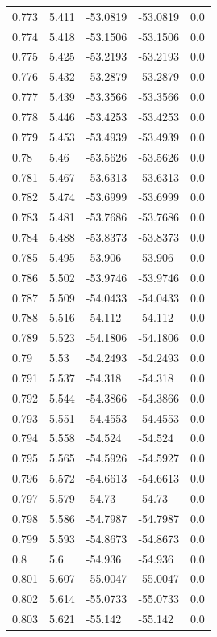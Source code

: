 \begin{table}[H]
\begin{tabular}{lllll}
0.773 & 5.411 & -53.0819 & -53.0819 & 0.0 \\
0.774 & 5.418 & -53.1506 & -53.1506 & 0.0 \\
0.775 & 5.425 & -53.2193 & -53.2193 & 0.0 \\
0.776 & 5.432 & -53.2879 & -53.2879 & 0.0 \\
0.777 & 5.439 & -53.3566 & -53.3566 & 0.0 \\
0.778 & 5.446 & -53.4253 & -53.4253 & 0.0 \\
0.779 & 5.453 & -53.4939 & -53.4939 & 0.0 \\
0.78 & 5.46 & -53.5626 & -53.5626 & 0.0 \\
0.781 & 5.467 & -53.6313 & -53.6313 & 0.0 \\
0.782 & 5.474 & -53.6999 & -53.6999 & 0.0 \\
0.783 & 5.481 & -53.7686 & -53.7686 & 0.0 \\
0.784 & 5.488 & -53.8373 & -53.8373 & 0.0 \\
0.785 & 5.495 & -53.906 & -53.906 & 0.0 \\
0.786 & 5.502 & -53.9746 & -53.9746 & 0.0 \\
0.787 & 5.509 & -54.0433 & -54.0433 & 0.0 \\
0.788 & 5.516 & -54.112 & -54.112 & 0.0 \\
0.789 & 5.523 & -54.1806 & -54.1806 & 0.0 \\
0.79 & 5.53 & -54.2493 & -54.2493 & 0.0 \\
0.791 & 5.537 & -54.318 & -54.318 & 0.0 \\
0.792 & 5.544 & -54.3866 & -54.3866 & 0.0 \\
0.793 & 5.551 & -54.4553 & -54.4553 & 0.0 \\
0.794 & 5.558 & -54.524 & -54.524 & 0.0 \\
0.795 & 5.565 & -54.5926 & -54.5927 & 0.0 \\
0.796 & 5.572 & -54.6613 & -54.6613 & 0.0 \\
0.797 & 5.579 & -54.73 & -54.73 & 0.0 \\
0.798 & 5.586 & -54.7987 & -54.7987 & 0.0 \\
0.799 & 5.593 & -54.8673 & -54.8673 & 0.0 \\
0.8 & 5.6 & -54.936 & -54.936 & 0.0 \\
0.801 & 5.607 & -55.0047 & -55.0047 & 0.0 \\
0.802 & 5.614 & -55.0733 & -55.0733 & 0.0 \\
0.803 & 5.621 & -55.142 & -55.142 & 0.0 \\

\end{tabular}
\end{table}
